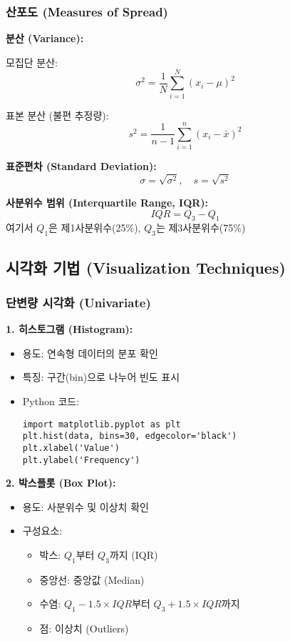 \documentclass[12pt,a4paper]{article}
\begin{document}
\subsubsection{산포도 (Measures of Spread)}

\textbf{분산 (Variance):}

모집단 분산:
\[
\sigma^2 = \frac{1}{N}\sum_{i=1}^{N} (x_i - \mu)^2
\]

표본 분산 (불편 추정량):
\[
s^2 = \frac{1}{n-1}\sum_{i=1}^{n} (x_i - \bar{x})^2
\]

\textbf{표준편차 (Standard Deviation):}
\[
\sigma = \sqrt{\sigma^2}, \quad s = \sqrt{s^2}
\]

\textbf{사분위수 범위 (Interquartile Range, IQR):}
\[
IQR = Q_3 - Q_1
\]
여기서 $Q_1$은 제1사분위수(25\%), $Q_3$는 제3사분위수(75\%)

\subsection{시각화 기법 (Visualization Techniques)}

\subsubsection{단변량 시각화 (Univariate)}

\textbf{1. 히스토그램 (Histogram):}
\begin{itemize}
    \item 용도: 연속형 데이터의 분포 확인
    \item 특징: 구간(bin)으로 나누어 빈도 표시
    \item Python 코드:
\begin{verbatim}
import matplotlib.pyplot as plt
plt.hist(data, bins=30, edgecolor='black')
plt.xlabel('Value')
plt.ylabel('Frequency')
\end{verbatim}
\end{itemize}

\textbf{2. 박스플롯 (Box Plot):}
\begin{itemize}
    \item 용도: 사분위수 및 이상치 확인
    \item 구성요소:
    \begin{itemize}
        \item 박스: $Q_1$부터 $Q_3$까지 (IQR)
        \item 중앙선: 중앙값 (Median)
        \item 수염: $Q_1 - 1.5 \times IQR$부터 $Q_3 + 1.5 \times IQR$까지
        \item 점: 이상치 (Outliers)
    \end{itemize}
\end{itemize}
\end{document}
